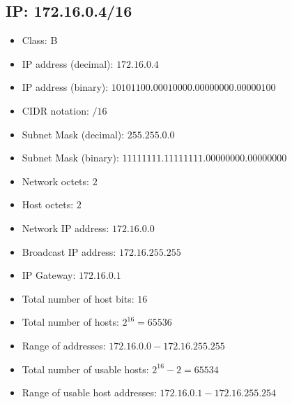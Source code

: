 \documentclass{article}
\begin{document}
\subsection*{IP: 172.16.0.4/16}
  \begin{itemize}
    \item Class: B
    \item IP address (decimal): $172.16.0.4$
    \item IP address (binary): $10101100.00010000.00000000.00000100$
    \item CIDR notation: $/16$
    \item Subnet Mask (decimal): $255.255.0.0$ 
    \item Subnet Mask (binary): $11111111.11111111.00000000.00000000$
    \item Network octets: $2$
    \item Host octets: $2$
    \item Network IP address: $172.16.0.0$
    \item Broadcast IP address: $172.16.255.255$
    \item IP Gateway: $172.16.0.1$
    \item Total number of host bits: $16$
    \item Total number of hosts: $2^{16} = 65536$
    \item Range of addresses: $172.16.0.0 - 172.16.255.255$
    \item Total number of usable hosts: $2^{16} - 2 = 65534$
    \item Range of usable host addresses: $172.16.0.1 - 172.16.255.254$
  \end{itemize}
\end{document}

